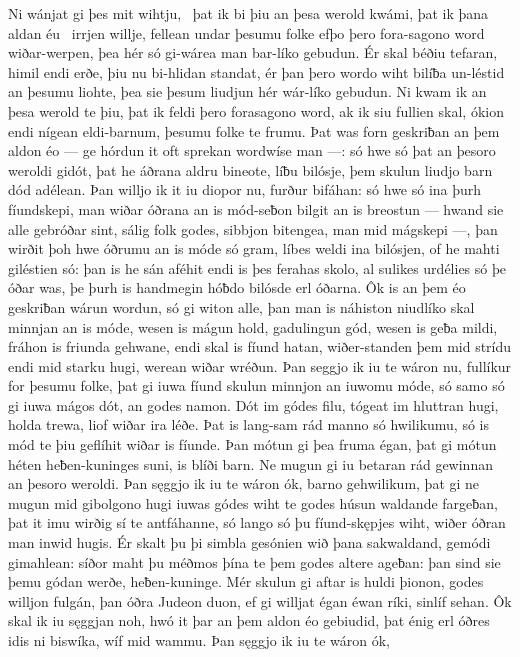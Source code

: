 Ni wánjat gi þes mit wihtju, \hld\ þat ik bi þiu an þesa werold kwámi,
þat ik þana aldan éu \hld\ irrjen willje,
fellean undar þesumu folke efþo þero fora-sagono
word wiðar-werpen, þea hér só gi-wárea man
bar-líko gebudun. Ér skal béðiu tefaran,
himil endi erðe, þiu nu bi-hlidan standat,
ér þan þero wordo wiht bilíƀa
un-léstid an þesumu liohte, þea sie þesum liudjun hér
wár-líko gebudun. Ni kwam ik an þesa werold te þiu,
þat ik feldi þero forasagono word, ak ik siu fullien skal,
ókion endi nígean eldi-barnum,
þesumu folke te frumu. Þat was forn geskriƀan
an þem aldon éo — ge hórdun it oft sprekan
wordwíse man —: só hwe só þat an þesoro weroldi gidót,
þat he áðrana aldru bineote,
líƀu bilósje, þem skulun liudjo barn
dód adélean. Þan willjo ik it iu diopor nu,
furður bifáhan: só hwe só ina þurh fíundskepi,
man wiðar óðrana an is mód-seƀon
bilgit an is breostun — hwand sie alle gebróðar sint,
sálig folk godes, sibbjon bitengea,
man mid mágskepi —, þan wirðit þoh hwe óðrumu an is móde só gram,
líbes weldi ina bilósjen, of he mahti giléstien só:
þan is he sán aféhit endi is þes ferahas skolo,
al sulikes urdélies só þe óðar was,
þe þurh is handmegin hóƀdo bilósde
erl óðarna. Ôk is an þem éo geskriƀan
wárun wordun, só gi witon alle,
þan man is náhiston niudlíko skal
minnjan an is móde, wesen is mágun hold,
gadulingun gód, wesen is geƀa mildi,
fráhon is friunda gehwane, endi skal is fíund hatan,
wiðer-standen þem mid strídu endi mid starku hugi,
werean wiðar wréðun. Þan seggjo ik iu te wáron nu,
fullíkur for þesumu folke, þat gi iuwa fíund skulun
minnjon an iuwomu móde, só samo só gi iuwa mágos dót,
an godes namon. Dót im gódes filu,
tógeat im hluttran hugi, holda trewa,
liof wiðar ira léðe. Þat is lang-sam rád
manno só hwilikumu, só is mód te þiu
geflíhit wiðar is fíunde. Þan mótun gi þea fruma égan,
þat gi mótun héten heƀen-kuninges suni,
is blíði barn. Ne mugun gi iu betaran rád
gewinnan an þesoro weroldi. Þan sęggjo ik iu te wáron ók,
barno gehwilikum, þat gi ne mugun mid gibolgono hugi
iuwas gódes wiht te godes húsun
waldande fargeƀan, þat it imu wirðig sí
te antfáhanne, só lango só þu fíund-skępjes wiht,
wiðer óðran man inwid hugis.
Ér skalt þu þi simbla gesónien wið þana sakwaldand,
gemódi gimahlean: síðor maht þu méðmos þína
te þem godes altere ageƀan: þan sind sie þemu gódan werðe,
heƀen-kuninge. Mér skulun gi aftar is huldi þionon,
godes willjon fulgán, þan óðra Judeon duon,
ef gi willjat égan éwan ríki,
sinlíf sehan. Ôk skal ik iu sęggjan noh,
hwó it þar an þem aldon éo gebiudid,
þat énig erl óðres idis ni biswíka,
wíf mid wammu. Þan sęggjo ik iu te wáron ók,
